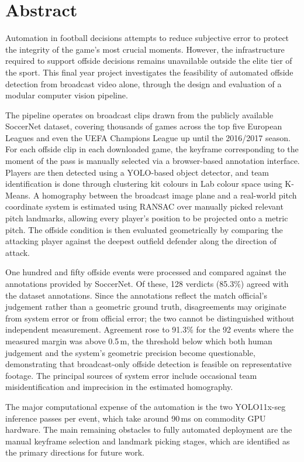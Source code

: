 \chapter*{Abstract}

Automation in football decisions attempts to reduce subjective error to protect the integrity of the game's most crucial moments. However, the infrastructure required to support offside decisions remains unavailable outside the elite tier of the sport. This final year project investigates the feasibility of automated offside detection from broadcast video alone, through the design and evaluation of a modular computer vision pipeline.

The pipeline operates on broadcast clips drawn from the publicly available SoccerNet dataset, covering thousands of games across the top five European Leagues and even the UEFA Champions League up until the 2016/2017 season. For each offside clip in each downloaded game, the keyframe corresponding to the moment of the pass is manually selected via a browser-based annotation interface. Players are then detected using a YOLO-based object detector, and team identification is done through clustering kit colours in Lab colour space using K-Means. A homography between the broadcast image plane and a real-world pitch coordinate system is estimated using RANSAC over manually picked relevant pitch landmarks, allowing every player's position to be projected onto a metric pitch. The offside condition is then evaluated geometrically by comparing the attacking player against the deepest outfield defender along the direction of attack.

One hundred and fifty offside events were processed and compared against the annotations provided by SoccerNet. Of these, 128 verdicts (85.3\%) agreed with the dataset annotations. Since the annotations reflect the match official's judgement rather than a geometric ground truth, disagreements may originate from system error or from official error; the two cannot be distinguished without independent measurement. Agreement rose to 91.3\% for the 92 events where the measured margin was above 0.5\,m, the threshold below which both human judgement and the system's geometric precision become questionable, demonstrating that broadcast-only offside detection is feasible on representative footage. The principal sources of system error include occasional team misidentification and imprecision in the estimated homography.

The major computational expense of the automation is the two YOLO11x-seg inference passes per event, which take around 90\,ms on commodity GPU hardware. The main remaining obstacles to fully automated deployment are the manual keyframe selection and landmark picking stages, which are identified as the primary directions for future work.